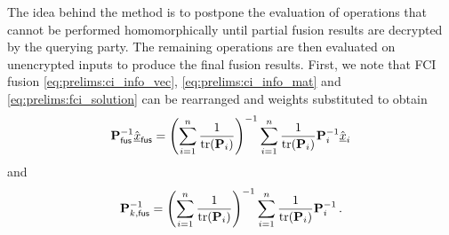 The idea behind the method is to postpone the evaluation of operations that cannot be performed homomorphically until partial fusion results are decrypted by the querying party. The remaining operations are then evaluated on unencrypted inputs to produce the final fusion results. First, we note that FCI fusion \eqref{eq:prelims:ci_info_vec}, \eqref{eq:prelims:ci_info_mat} and \eqref{eq:prelims:fci_solution} can be rearranged and weights substituted to obtain
\begin{equation}\label{eq:cloud_fusion:secfci2_info_vec_rearrange}
    {\ensuremath{{\mathbf{P}}}}_{\mathsf{fus}}^{-1}\hat{{\underline{x}}}_{\mathsf{fus}} = \left(\sum_{i=1}^n \frac{1}{\operatorname{tr}({{\mathbf{P}}}_i)}\right)^{-1}\sum_{i=1}^n\frac{1}{\operatorname{tr}({{\mathbf{P}}}_i)}{{\mathbf{P}}}_i^{-1}\hat{{\underline{x}}}_i
\end{equation}
and
\begin{equation}\label{eq:cloud_fusion:secfci2_info_mat_rearrange}
    {\ensuremath{{\mathbf{P}}}}_{k,\mathsf{fus}}^{-1} = \left(\sum_{i=1}^n \frac{1}{\operatorname{tr}({{\mathbf{P}}}_i)}\right)^{-1}\sum_{i=1}^n \frac{1}{\operatorname{tr}({{\mathbf{P}}}_i)}{{\mathbf{P}}}_i^{-1}\,.
\end{equation}

